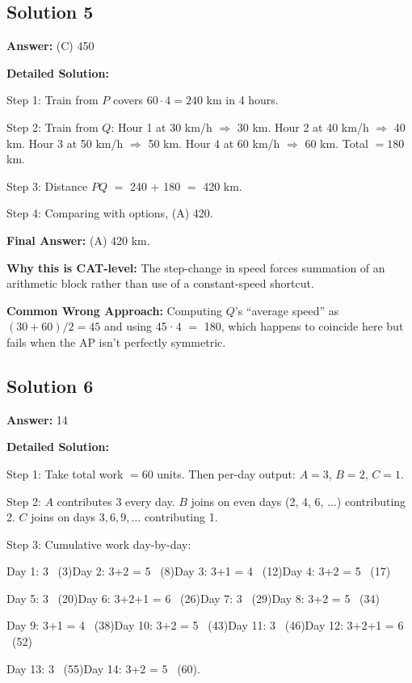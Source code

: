 \documentclass[11pt]{article}
\begin{document}
\subsection*{Solution 5}
\textbf{Answer:} (C) 450

\textbf{Detailed Solution:}

Step 1: Train from $P$ covers $60 \cdot 4 = 240$ km in 4 hours.

Step 2: Train from $Q$: Hour 1 at 30 km/h $\Rightarrow$ 30 km. Hour 2 at 40 km/h $\Rightarrow$ 40 km. Hour 3 at 50 km/h $\Rightarrow$ 50 km. Hour 4 at 60 km/h $\Rightarrow$ 60 km. Total $= 180$ km.

Step 3: Distance $PQ$ $=$ 240 + 180 $=$ 420 km.

Step 4: Comparing with options, (A) 420.

\textbf{Final Answer:} (A) 420 km.

\textbf{Why this is CAT-level:} The step-change in speed forces summation of an arithmetic block rather than use of a constant-speed shortcut.

\textbf{Common Wrong Approach:} Computing $Q$'s ``average speed'' as $(30+60)/2 = 45$ and using 45·4 $=$ 180, which happens to coincide here but fails when the AP isn't perfectly symmetric.

\subsection*{Solution 6}
\textbf{Answer:} 14

\textbf{Detailed Solution:}

Step 1: Take total work $= 60$ units. Then per-day output: $A = 3$, $B = 2$, $C = 1$.

Step 2: $A$ contributes 3 every day. $B$ joins on even days (2, 4, 6, $\ldots$) contributing 2. $C$ joins on days $3, 6, 9, \ldots$ contributing 1.

Step 3: Cumulative work day-by-day:

Day 1: 3 \ (3)\quad Day 2: 3+2 = 5 \ (8)\quad Day 3: 3+1 = 4 \ (12)\quad Day 4: 3+2 = 5 \ (17)

Day 5: 3 \ (20)\quad Day 6: 3+2+1 = 6 \ (26)\quad Day 7: 3 \ (29)\quad Day 8: 3+2 = 5 \ (34)

Day 9: 3+1 = 4 \ (38)\quad Day 10: 3+2 = 5 \ (43)\quad Day 11: 3 \ (46)\quad Day 12: 3+2+1 = 6 \ (52)

Day 13: 3 \ (55)\quad Day 14: 3+2 = 5 \ (60).
\end{document}

